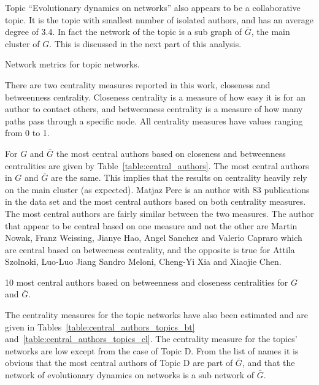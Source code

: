 \documentclass{article}
\theoremstyle{definition}
\begin{document}
Topic ``Evolutionary dynamics on networks'' also appears to be a collaborative
topic. It is the topic with smallest number of isolated authors, and has an
average degree of 3.4. In fact the network of the topic is a
sub graph of \(\bar{G}\), the main cluster of $G$. This is discussed in the next
part of this analysis.

\begin{table}[H]
    \centering
    \resizebox{\textwidth}{!}{
    }
    \caption{Network metrics for topic networks.}\label{table:topics_networks}
\end{table}

There are two centrality measures reported in this work, closeness and
betweenness centrality. Closeness centrality is a measure of how easy it is for
an author to contact others, and betweenness centrality is a
measure of how many paths pass through a specific node. All centrality measures 
have values ranging from 0 to 1.

For \(G\) and \(\bar{G}\) the most central authors based on closeness and
betweenness centralities are given by Table~\ref{table:central_authors}. The
most central authors in \(G\) and \(\bar{G}\) are the same. This implies that
the results on centrality heavily rely on the main cluster (as expected). Matjaz Perc is an
author with 83 publications in the data set and the most central authors based
on both centrality measures. The most central authors are fairly similar between
the two measures. The author that appear to be central based on one measure and
not the other are Martin Nowak, Franz Weissing, Jianye Hao, Angel Sanchez and
Valerio Capraro which are central based on betweeness centrality, and 
the opposite is true for Attila Szolnoki, Luo-Luo Jiang Sandro Meloni, Cheng-Yi
Xia and Xiaojie Chen.

\begin{table}[!hbtp]
    \begin{center}
    \resizebox{.9\textwidth}{!}{}
\end{center}
\caption{10 most central authors based on betweenness and closeness centralities
for \(G\) and \(\bar{G}\).}\label{table:central_authors}
\end{table}

The
centrality measures for the topic networks have also been estimated and are
given in Tables~\ref{table:central_authors_topics_bt}
and~\ref{table:central_authors_topics_cl}. The centrality measure for the
topics' networks are low except from the case of Topic D. From the
list of names it is obvious that the most central authors of Topic D are part of \(\bar{G}\), and that
the network of evolutionary dynamics on networks is a sub network of \(\bar{G}\).
\end{document}
